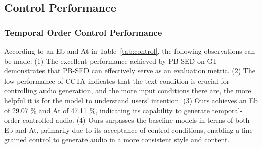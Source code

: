 \documentclass[letterpaper]{article}
\begin{document}
\subsection{Control Performance}

\begin{table}[!h]\footnotesize
    \centering
    \caption{The control performance between Ours and baseline models. ``GT'' stands for the ground-truth recordings.}
    \label{tab:control}
\end{table}

\subsubsection{Temporal Order Control Performance} According to an Eb and At in Table~\ref{tab:control}, the following observations can be made: (1) The excellent performance achieved by PB-SED on GT demonstrates that PB-SED can effectively serve as an evaluation metric. (2) The low performance of CCTA indicates that the text condition is crucial for controlling audio generation, and the more input conditions there are, the more helpful it is for the model to understand users' intention. (3) Ours achieves an Eb of 29.07 \% and At of 47.11 \%, indicating its capability to generate temporal-order-controlled audio. (4) Ours surpasses the baseline models in terms of both Eb and At, primarily due to its acceptance of control conditions, enabling a fine-grained control to generate audio in a more consistent style and content.
\end{document}
